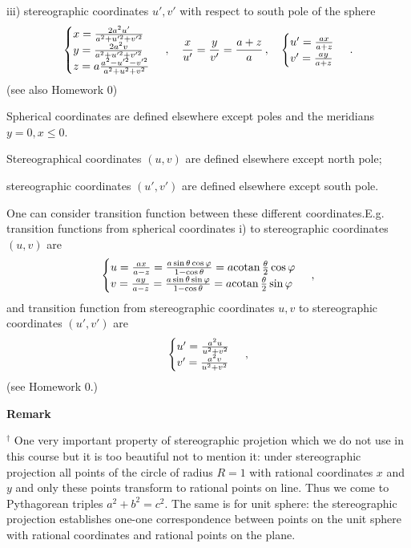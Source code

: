 \documentclass[12pt]{article}
\theoremstyle{theorem}
\numberwithin{equation}{section}
\begin{document}
iii)  stereographic coordinates $u',v'$
with respect to south pole of the sphere
     \begin{equation*}
      \begin{cases}
    x={2a^2u'\over a^2+u'^2+v'^2}\cr
    y={2a^2v\over a^2+u'^2+v'^2}\cr
    z=a{a^2-u'^2-v'^2\over a^2+u^2+v^2} \cr
      \end{cases}\,,\quad
       {x\over u'}=      
       {y\over v'}=      
       {a+z\over a}\,,\quad
    \begin{cases}
      u'={ax\over a+z}\cr
      v'={ay\over a+z}\cr
     \end{cases}\,.     
     \end{equation*}
(see also Homework 0)

Spherical coordinates are defined elsewhere except
 poles and  the  meridians  $y=0,x\leq 0$.

Stereographical coordinates $(u,v)$ are defined elsewhere
except north pole;  

stereographic 
coordinates $(u',v')$ are defined elsewhere
except south pole. 

One can consider transition function
between these different coordinates.E.g. transition functions
from spherical coordinates i) 
to stereographic coordinates
  $(u,v)$ are
     \begin{equation*}
       \begin{cases}
     u={ax\over a-z}=
{a\sin\theta\cos\varphi\over 1-\cos\theta}=
  a{\rm cotan\,}{\theta\over 2}\cos\varphi\cr
     v={ay\over a-z}=
{a\sin\theta\sin\varphi\over 1-\cos\theta}=
  a{\rm cotan\,}{\theta\over 2}\sin\varphi\cr
        \end{cases}\,,
     \end{equation*}
and transition function from stereographic
coordinates $u,v$ to stereographic coordinates
$(u',v')$
are
      \begin{equation*}
       \begin{cases}
     u'={a^2u\over u^2+v^2}\cr
     v'={a^2v\over u^2+v^2}\cr
        \end{cases}\,,
     \end{equation*}
(see Homework 0.)

{\bf Remark}

{\footnotesize $^\dagger$ One very important property of stereographic projetion
which we do not use in this course but it is too beautiful not to mention it:
under stereographic projection  all points
of the circle of radius $R=1$
with rational coordinates $x$ and $y$ and 
only these points
transform to rational points on line. 
Thus we come to
Pythagorean triples $a^2+b^2=c^2$.
The same is for unit sphere: the stereographic
projection establishes one-one correspondence
between points on the unit sphere with rational
coordinates and rational points on the plane. }
\end{document}
